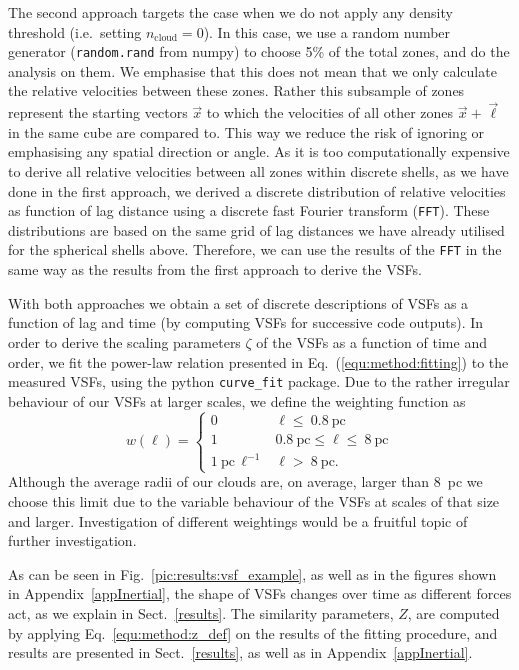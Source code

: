 \documentclass{aa}		%
\begin{document}
The second approach targets the case when we do not apply any density threshold (i.e.~setting $n_\mathrm{cloud} =0$).
In this case, we use a random number generator (\texttt{random.rand} from numpy) to choose 5\% of the total zones, and do the analysis on them.
We emphasise that this does not mean that we only calculate the relative velocities between these zones. Rather this subsample of zones represent the starting vectors $\vec{x}$ to which the velocities of all other zones $\vec{x} + \vec{\ell}$ in the same cube are compared to. This way we reduce the risk of ignoring or emphasising any spatial direction or angle.
As it is too computationally expensive to derive all relative velocities between all zones within discrete shells, as we have done in the first approach, we derived a discrete distribution of relative velocities as function of lag distance using a discrete fast Fourier transform (\texttt{FFT}). 
These distributions are based on the same grid of lag distances we have already utilised for the spherical shells above.
Therefore, we can use the results of the \texttt{FFT} in the same way as the results from the first approach to derive the VSFs.

With both approaches we obtain a set of discrete descriptions of VSFs as a function of  lag  and time (by computing VSFs for successive code outputs).
In order to derive the scaling parameters $\zeta$ of the VSFs as a function of time and order, we fit the power-law relation presented in Eq.~(\ref{equ:method:fitting}) to the measured VSFs, using the python \texttt{curve\_fit} package.
Due to the rather irregular behaviour of our VSFs at larger scales, we define the weighting function as
\begin{equation}
w\left(\ell\right) = \begin{cases}
    0 & \ell \leq~\mathrm{0.8~pc} \\
    1 & \mathrm{0.8~pc} \leq \ell \leq~\mathrm{8~pc} \\
    \mathrm{1~pc}\,\ell^{-1} & \ell >~\mathrm{8~pc}.
\end{cases}
\end{equation}
\noindent Although the average radii of our clouds are, on average, larger than 8~pc we choose this limit due to the variable behaviour of the VSFs at scales of that size and larger.
Investigation of different weightings would be a fruitful topic of further investigation.

As can be seen in Fig.~\ref{pic:results:vsf_example}, as well as in the figures shown in Appendix~\ref{appInertial}, the shape of VSFs changes over time as different forces act, as we explain in Sect.~\ref{results}. 
The similarity parameters, $Z$, are computed by applying Eq.~\ref{equ:method:z_def} on the results of the fitting procedure, and results are presented in Sect.~\ref{results}, as well as in Appendix~\ref{appInertial}.
\end{document}
